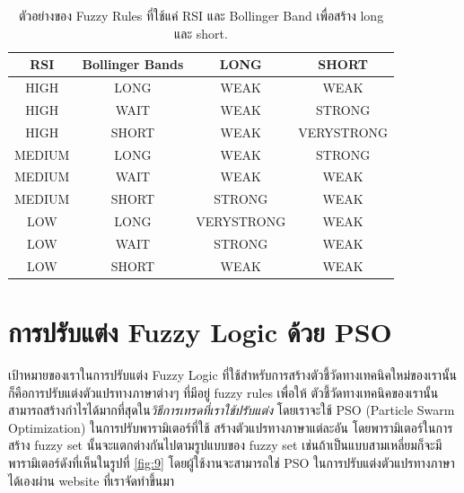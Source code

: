 \begin{table}[htp]
    \centering
    \begin{tabular}{c c c c}
        \toprule
        {RSI}  & {Bollinger Bands} & {LONG}     & {SHORT}    \\
        \midrule
        HIGH   & LONG              & WEAK       & WEAK       \\
        HIGH   & WAIT              & WEAK       & STRONG     \\
        HIGH   & SHORT             & WEAK       & VERYSTRONG \\
        MEDIUM & LONG              & WEAK       & STRONG     \\
        MEDIUM & WAIT              & WEAK       & WEAK       \\
        MEDIUM & SHORT             & STRONG     & WEAK       \\
        LOW    & LONG              & VERYSTRONG & WEAK       \\
        LOW    & WAIT              & STRONG     & WEAK       \\
        LOW    & SHORT             & WEAK       & WEAK       \\
        \bottomrule
    \end{tabular}
    \caption{ตัวอย่างของ Fuzzy Rules ที่ใช้แค่ RSI และ Bollinger Band เพื่อสร้าง long และ short.}
    \label{table:1}
\end{table}
\FloatBarrier

\section{การปรับแต่ง Fuzzy Logic ด้วย PSO}
เป้าหมายของเราในการปรับแต่ง Fuzzy Logic ที่ใช้สำหรับการสร้างตัวชี้วัดทางเทคนิคใหม่ของเรานั้น ก็คือการปรับแต่งตัวแปรทางภาษาต่างๆ ที่มีอยู่ fuzzy rules เพื่อให้
ตัวชี้วัดทางเทคนิคของเรานั้นสามารถสร้างกำไรได้มากที่สุดใน\emph{วิธีการเทรดที่เราใช้ปรับแต่ง} โดยเราจะใช้ PSO (Particle Swarm Optimization) ในการปรับพารามิเตอร์ที่ใช้
สร้างตัวแปรทางภาษาแต่ละอัน โดยพารามิเตอร์ในการสร้าง fuzzy set นั้นจะแตกต่างกันไปตามรูปแบบของ fuzzy set
เช่นถ้าเป็นแบบสามเหลี่ยมก็จะมีพารามิเตอร์ดังที่เห็นในรูปที่ \ref{fig:9} โดยผู้ใช้งานจะสามารถใช่ PSO ในการปรับแต่งตัวแปรทางภาษาได้เองผ่าน website ที่เราจัดทำขึ้นมา

